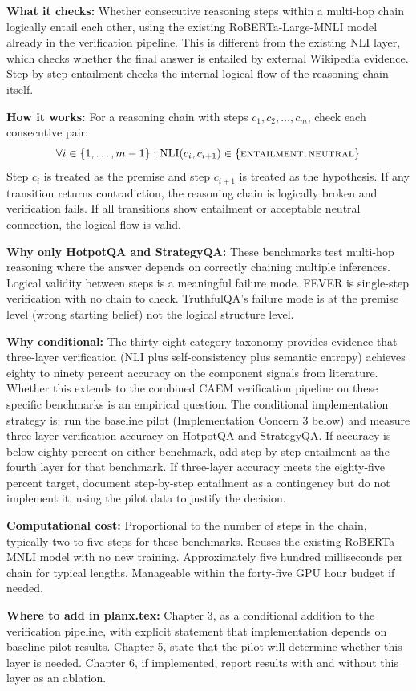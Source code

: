 \documentclass[11pt,a4paper]{article}
\newcommand{\architecturebox}[2]{%
\begin{tcolorbox}[enhanced,breakable,
  colback=LightTeal,colframe=Teal,boxrule=1.5pt,arc=4pt,
  left=8pt,right=8pt,top=6pt,bottom=6pt,
  title={\bfseries\small\color{white}#1},
  attach boxed title to top left={yshift=-2mm,xshift=6mm},
  boxed title style={colback=Teal,arc=3pt,boxrule=0pt,
    left=4pt,right=4pt,top=2pt,bottom=2pt}]
#2
\end{tcolorbox}}
\begin{document}
\architecturebox{VERIFICATION UPDATE 5: Logical Validity Checking for Multi-Hop Reasoning (Conditional Fourth Layer)}{
\textbf{What it checks:} Whether consecutive reasoning steps within a multi-hop chain logically entail each other, using the existing RoBERTa-Large-MNLI model already in the verification pipeline. This is different from the existing NLI layer, which checks whether the final answer is entailed by external Wikipedia evidence. Step-by-step entailment checks the internal logical flow of the reasoning chain itself.

\textbf{How it works:} For a reasoning chain with steps $c_1, c_2, \ldots, c_m$, check each consecutive pair:
\[
\forall i \in \{1, \ldots, m-1\}: \text{NLI}(c_i, c_{i+1}) \in \{\textsc{entailment}, \textsc{neutral}\}
\]
Step $c_i$ is treated as the premise and step $c_{i+1}$ is treated as the hypothesis. If any transition returns contradiction, the reasoning chain is logically broken and verification fails. If all transitions show entailment or acceptable neutral connection, the logical flow is valid.

\textbf{Why only HotpotQA and StrategyQA:} These benchmarks test multi-hop reasoning where the answer depends on correctly chaining multiple inferences. Logical validity between steps is a meaningful failure mode. FEVER is single-step verification with no chain to check. TruthfulQA's failure mode is at the premise level (wrong starting belief) not the logical structure level.

\textbf{Why conditional:} The thirty-eight-category taxonomy provides evidence that three-layer verification (NLI plus self-consistency plus semantic entropy) achieves eighty to ninety percent accuracy on the component signals from literature. Whether this extends to the combined CAEM verification pipeline on these specific benchmarks is an empirical question. The conditional implementation strategy is: run the baseline pilot (Implementation Concern 3 below) and measure three-layer verification accuracy on HotpotQA and StrategyQA. If accuracy is below eighty percent on either benchmark, add step-by-step entailment as the fourth layer for that benchmark. If three-layer accuracy meets the eighty-five percent target, document step-by-step entailment as a contingency but do not implement it, using the pilot data to justify the decision.

\textbf{Computational cost:} Proportional to the number of steps in the chain, typically two to five steps for these benchmarks. Reuses the existing RoBERTa-MNLI model with no new training. Approximately five hundred milliseconds per chain for typical lengths. Manageable within the forty-five GPU hour budget if needed.

\textbf{Where to add in planx.tex:} Chapter 3, as a conditional addition to the verification pipeline, with explicit statement that implementation depends on baseline pilot results. Chapter 5, state that the pilot will determine whether this layer is needed. Chapter 6, if implemented, report results with and without this layer as an ablation.
}
\end{document}
